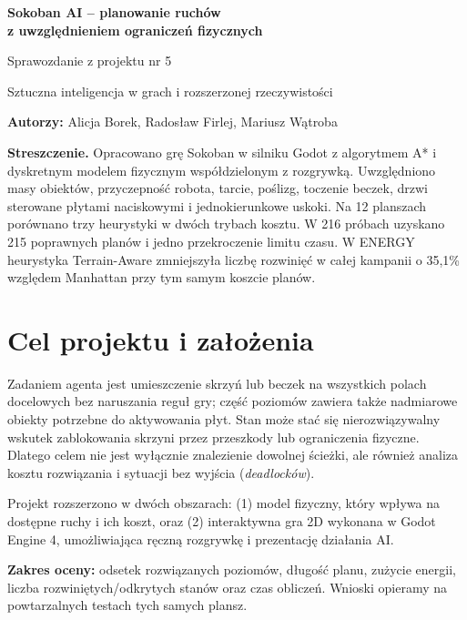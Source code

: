 \documentclass[a4paper,11pt]{article}
\begin{document}
\begin{center}
    {\Large\bfseries Sokoban AI -- planowanie ruchów\\z uwzględnieniem ograniczeń fizycznych\par}
    \vspace{0.55em}
    {\large Sprawozdanie z projektu nr 5}\par
    \vspace{0.45em}
    {\normalsize Sztuczna inteligencja w grach i rozszerzonej rzeczywistości}\par
    \vspace{0.65em}
    {\normalsize \textbf{Autorzy:} Alicja Borek, Radosław Firlej, Mariusz Wątroba}\par
\end{center}

\textbf{Streszczenie.} Opracowano grę Sokoban w silniku Godot z algorytmem A* i dyskretnym modelem fizycznym współdzielonym z rozgrywką. Uwzględniono masy obiektów, przyczepność robota, tarcie, poślizg, toczenie beczek, drzwi sterowane płytami naciskowymi i jednokierunkowe uskoki. Na 12 planszach porównano trzy heurystyki w dwóch trybach kosztu. W 216 próbach uzyskano 215 poprawnych planów i jedno przekroczenie limitu czasu. W ENERGY heurystyka Terrain-Aware zmniejszyła liczbę rozwinięć w całej kampanii o 35,1\% względem Manhattan przy tym samym koszcie planów.

\section{Cel projektu i założenia}
Zadaniem agenta jest umieszczenie skrzyń lub beczek na wszystkich polach docelowych bez naruszania reguł gry; część poziomów zawiera także nadmiarowe obiekty potrzebne do aktywowania płyt. Stan może stać się nierozwiązywalny wskutek zablokowania skrzyni przez przeszkody lub ograniczenia fizyczne. Dlatego celem nie jest wyłącznie znalezienie dowolnej ścieżki, ale również analiza kosztu rozwiązania i sytuacji bez wyjścia (\emph{deadlocków}).

Projekt rozszerzono w dwóch obszarach: (1) model fizyczny, który wpływa na dostępne ruchy i ich koszt, oraz (2) interaktywna gra 2D wykonana w Godot Engine 4, umożliwiająca ręczną rozgrywkę i prezentację działania AI.

\textbf{Zakres oceny:} odsetek rozwiązanych poziomów, długość planu, zużycie energii, liczba rozwiniętych/odkrytych stanów oraz czas obliczeń. Wnioski opieramy na powtarzalnych testach tych samych plansz.
\end{document}
